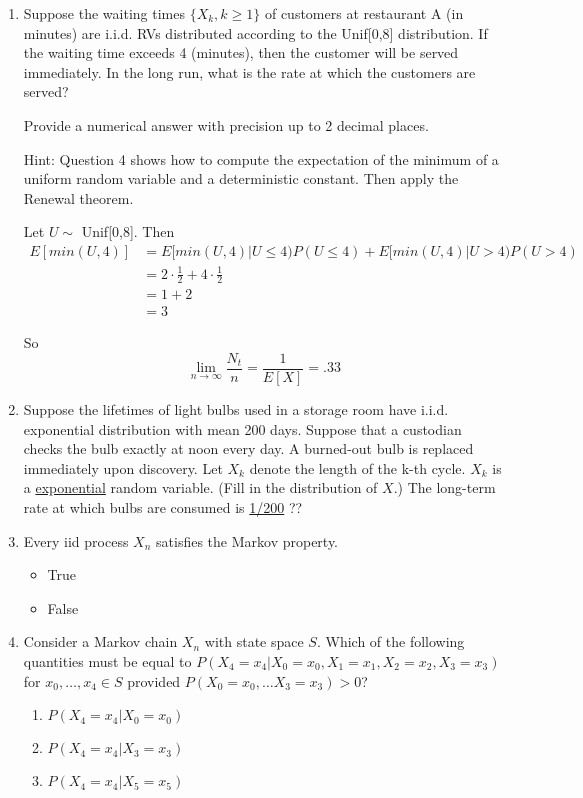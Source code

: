 \documentclass[10pt]{article}
\begin{document}
\begin{enumerate}
\newpage

  \item Suppose the waiting times $\{X_k, k \geq 1\}$ of customers at
    restaurant A (in minutes) are i.i.d. RVs distributed according to the
    Unif[0,8] distribution. If the waiting time exceeds 4 (minutes), then
    the customer will be served immediately. In the long run, what is the
    rate at which the customers are served? 

    Provide a numerical answer with precision up to 2 decimal places.

    Hint: Question 4 shows how to compute the expectation of the minimum of
    a uniform random variable and a deterministic constant. Then apply the
    Renewal theorem. 

    Let $U \sim$ Unif[0,8].  Then
    \begin{align*}
      E[min(U, 4)] &= E[min(U, 4) | U \leq 4)P(U \leq 4) + 
                              E[min(U,4) | U > 4)P(U > 4) \\
                   &= 2 \cdot  \frac{1}{2} + 4 \cdot  \frac{1}{2}  \\
                   &= 1 + 2  \\
                   &= 3
    \end{align*}

    So 
    \[ \lim_{n \to \infty} \frac{N_t}{n} = \frac{1}{E[X]} = .33 \]

\newpage

  \item Suppose the lifetimes of light bulbs used in a storage room have
    i.i.d. exponential distribution with mean 200 days. Suppose that a
    custodian checks the bulb exactly at noon every day. A burned-out bulb
    is replaced immediately upon discovery. Let $X_k$ denote the length of
    the k-th cycle. $X_k$ is a \underline{exponential} random variable.
    (Fill in the distribution of $X$.) The long-term rate at which bulbs
    are consumed is \underline{1/200} ??

\newpage

  \item Every iid process $X_n$ satisfies the Markov property.
    \begin{itemize}
      \item True \checkmark
      \item False
    \end{itemize}

\newpage

  \item Consider a Markov chain $X_n$ with state space $S$.  Which of the
    following quantities must be equal to $P(X_4 = x_4 | X_0 = x_0, X_1 = 
    x_1, X_2 = x_2, X_3 = x_3)$ for $x_0, \dots, x_4 \in S$ provided
    $P(X_0=x_0, \dots X_3 = x_3) > 0$?
    \begin{enumerate}
      \item $P(X_4 = x_4 | X_0 = x_0)$
      \item $P(X_4 = x_4 | X_3 = x_3)$ \checkmark
      \item $P(X_4 = x_4 | X_5 = x_5)$
    \end{enumerate}


\end{enumerate}
\end{document}
